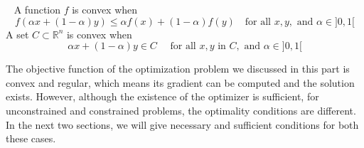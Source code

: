 \begin{defn}~\citep{JS:06}
    A function $f$ is convex when 
    $$
        f(\alpha x+(1-\alpha) y) \leq \alpha f(x)+(1-\alpha) f(y) \quad \textrm{for all } x, y, \textrm{ and } \alpha \in ]0,1[
    $$
    A set $C \subset \mathbb{R}^n$ is convex when 
    $$
    \alpha x+(1-\alpha) y \in C \quad \textrm { for all } x, y \textrm { in } C, \textrm{ and } \alpha \in ] 0,1[
    $$
\end{defn}
The objective function of the optimization problem we discussed in this part is convex and regular, which means its gradient can be computed and the solution exists. However, although the existence of the optimizer is sufficient, for unconstrained and constrained problems, the optimality conditions are different. In the next two sections, we will give necessary and sufficient conditions for both these cases. 

